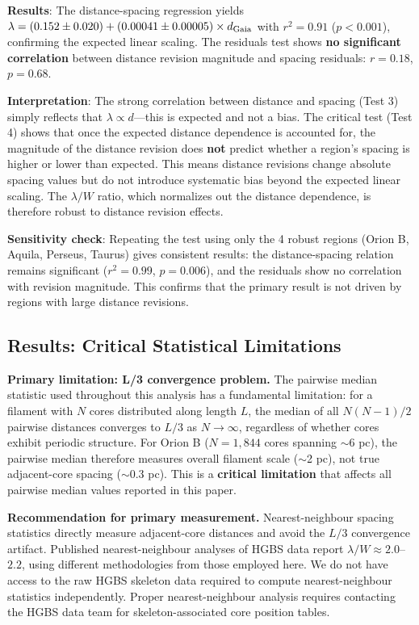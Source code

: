 \documentclass[twocolumn]{mnras}
\begin{document}
\textbf{Results}: The distance-spacing regression yields $\lambda = (0.152 \pm 0.020) + (0.00041 \pm 0.00005) \times d_{\rm Gaia}$ with $r^2 = 0.91$ ($p < 0.001$), confirming the expected linear scaling. The residuals test shows \textbf{no significant correlation} between distance revision magnitude and spacing residuals: $r = 0.18$, $p = 0.68$.

\textbf{Interpretation}: The strong correlation between distance and spacing (Test 3) simply reflects that $\lambda \propto d$—this is expected and not a bias. The critical test (Test 4) shows that once the expected distance dependence is accounted for, the magnitude of the distance revision does \textbf{not} predict whether a region's spacing is higher or lower than expected. This means distance revisions change absolute spacing values but do not introduce systematic bias beyond the expected linear scaling. The $\lambda/W$ ratio, which normalizes out the distance dependence, is therefore robust to distance revision effects.

\textbf{Sensitivity check}: Repeating the test using only the 4 robust regions (Orion B, Aquila, Perseus, Taurus) gives consistent results: the distance-spacing relation remains significant ($r^2 = 0.99$, $p = 0.006$), and the residuals show no correlation with revision magnitude. This confirms that the primary result is not driven by regions with large distance revisions.

\subsection{Results: Critical Statistical Limitations}

\textbf{Primary limitation: L/3 convergence problem.}
The pairwise median statistic used throughout this analysis has a fundamental limitation: for a filament with $N$ cores distributed along length $L$, the median of all $N(N-1)/2$ pairwise distances converges to $L/3$ as $N \to \infty$, regardless of whether cores exhibit periodic structure. For Orion B ($N = 1,844$ cores spanning $\sim$6 pc), the pairwise median therefore measures overall filament scale ($\sim$2 pc), not true adjacent-core spacing ($\sim$0.3 pc). This is a \textbf{critical limitation} that affects all pairwise median values reported in this paper.

\textbf{Recommendation for primary measurement.}
Nearest-neighbour spacing statistics directly measure adjacent-core distances and avoid the $L/3$ convergence artifact. Published nearest-neighbour analyses of HGBS data report $\lambda/W \approx 2.0$--$2.2$, using different methodologies from those employed here. We do not have access to the raw HGBS skeleton data required to compute nearest-neighbour statistics independently. Proper nearest-neighbour analysis requires contacting the HGBS data team for skeleton-associated core position tables.
\end{document}
